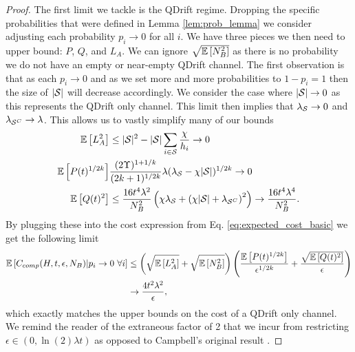 \begin{proof}
The first limit we tackle is the QDrift regime. Dropping the specific probabilities that were defined in Lemma \ref{lem:prob_lemma} we consider adjusting each probability $p_i \to 0$ for all $i$. We have three pieces we then need to upper bound: $P$, $Q$, and $L_A$. We can ignore $\sqrt{\mathbb{E}\left[ N_B^2 \right]}$ as there is no probability we do not have an empty or near-empty QDrift channel. The first observation is that as each $p_i \to 0$ and as we set more and more probabilities to $1 - p_i = 1$ then the size of $|\mathcal{S}|$ will decrease accordingly. We consider the case where $|\mathcal{S}| \to 0$ as this represents the QDrift only channel. This limit then implies that $\lambda_{\mathcal{S}} \to 0$ and $\lambda_{\mathcal{S}^C} \to \lambda$. This allows us to vastly simplify many of our bounds
\begin{align}
    \mathbb{E}\left[ L_A^2 \right] &\leq |\mathcal{S}|^2 - |\mathcal{S}| \sum_{i \in \mathcal{S}} \frac{\chi}{h_i} \to 0 \\
    \mathbb{E}\left[ P(t)^{1/2k} \right] & \frac{(2 \Upsilon)^{1 + 1/k}}{(2k+1)^{1/2k}} \lambda (\lambda_{\mathcal{S}} - \chi |\mathcal{S}|)^{1/2k} \to 0 \\
    \mathbb{E}\left[ Q(t)^2 \right] &\leq \frac{16 t^4 \lambda^2}{N_B^2} \left( \chi \lambda_{\mathcal{S}} + \left( \chi |\mathcal{S}| + \lambda_{\mathcal{S}^C} \right)^2 \right) \to \frac{16 t^4 \lambda^4}{N_B^2}.
\end{align}
By plugging these into the cost expression from Eq. \ref{eq:expected_cost_basic} we get the following limit
\begin{align}
    \mathbb{E}\left[ C_{comp}(H, t, \epsilon, N_B) | p_i \to 0 \text{ } \forall i \right] &\leq \left( \sqrt{\mathbb{E}\left[ L_A^2 \right]} + \sqrt{\mathbb{E}\left[ N_B^2 \right]} \right) \left( \frac{\mathbb{E}\left[ P(t)^{1/2k} \right]}{\epsilon^{1/2k}} + \frac{\sqrt{\mathbb{E}\left[ Q(t)^2 \right]}}{\epsilon} \right) \\
    &\to \frac{4 t^2 \lambda^2}{\epsilon},
\end{align}
which exactly matches the upper bounds on the cost of a QDrift only channel. We remind the reader of the extraneous factor of 2 that we incur from restricting $\epsilon \in (0, \ln(2) \lambda t)$ as opposed to Campbell's original result \cite{qdrift}. 


\end{proof}
